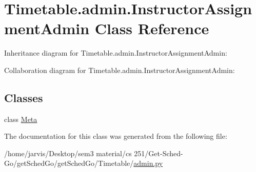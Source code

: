\hypertarget{classTimetable_1_1admin_1_1InstructorAssignmentAdmin}{}\section{Timetable.\+admin.\+Instructor\+Assignment\+Admin Class Reference}
\label{classTimetable_1_1admin_1_1InstructorAssignmentAdmin}


Inheritance diagram for Timetable.\+admin.\+Instructor\+Assignment\+Admin\+:


Collaboration diagram for Timetable.\+admin.\+Instructor\+Assignment\+Admin\+:
\subsection*{Classes}
\begin{DoxyCompactItemize}
\item 
class \hyperlink{classTimetable_1_1admin_1_1InstructorAssignmentAdmin_1_1Meta}{Meta}
\end{DoxyCompactItemize}


The documentation for this class was generated from the following file\+:\begin{DoxyCompactItemize}
\item 
/home/jarvis/\+Desktop/sem3 material/cs 251/\+Get-\/\+Sched-\/\+Go/get\+Sched\+Go/get\+Sched\+Go/\+Timetable/\hyperlink{Timetable_2admin_8py}{admin.\+py}\end{DoxyCompactItemize}
